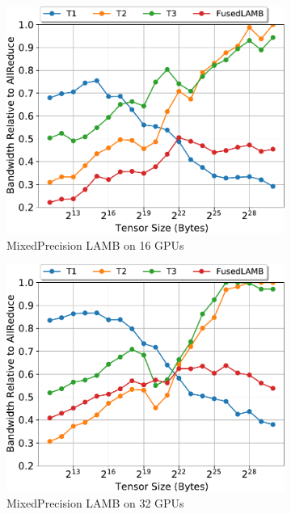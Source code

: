 \begin{figure}
  \begin{subfigure}{0.66\columnwidth}
    \includegraphics[width=\columnwidth]{figures/results-lambfp16-16-gpus.pdf} 
    \caption{MixedPrecision LAMB on 16 GPUs} 
  \end{subfigure}
  \begin{subfigure}{0.66\columnwidth}
    \includegraphics[width=\columnwidth]{figures/results-lambfp16-32-gpus.pdf}  
    \caption{MixedPrecision LAMB on 32 GPUs} 
  \end{subfigure}
  \begin{subfigure}{0.66\columnwidth}

\end{subfigure}
\end{figure}
